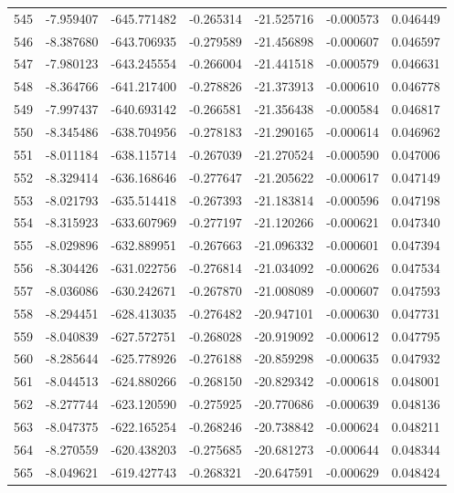 \begin{tabular}{rrrrrrr}
 545 &  -7.959407 & -645.771482 & -0.265314 &  -21.525716 &   -0.000573 &  0.046449 \\
 546 &  -8.387680 & -643.706935 & -0.279589 &  -21.456898 &   -0.000607 &  0.046597 \\
 547 &  -7.980123 & -643.245554 & -0.266004 &  -21.441518 &   -0.000579 &  0.046631 \\
 548 &  -8.364766 & -641.217400 & -0.278826 &  -21.373913 &   -0.000610 &  0.046778 \\
 549 &  -7.997437 & -640.693142 & -0.266581 &  -21.356438 &   -0.000584 &  0.046817 \\
 550 &  -8.345486 & -638.704956 & -0.278183 &  -21.290165 &   -0.000614 &  0.046962 \\
 551 &  -8.011184 & -638.115714 & -0.267039 &  -21.270524 &   -0.000590 &  0.047006 \\
 552 &  -8.329414 & -636.168646 & -0.277647 &  -21.205622 &   -0.000617 &  0.047149 \\
 553 &  -8.021793 & -635.514418 & -0.267393 &  -21.183814 &   -0.000596 &  0.047198 \\
 554 &  -8.315923 & -633.607969 & -0.277197 &  -21.120266 &   -0.000621 &  0.047340 \\
 555 &  -8.029896 & -632.889951 & -0.267663 &  -21.096332 &   -0.000601 &  0.047394 \\
 556 &  -8.304426 & -631.022756 & -0.276814 &  -21.034092 &   -0.000626 &  0.047534 \\
 557 &  -8.036086 & -630.242671 & -0.267870 &  -21.008089 &   -0.000607 &  0.047593 \\
 558 &  -8.294451 & -628.413035 & -0.276482 &  -20.947101 &   -0.000630 &  0.047731 \\
 559 &  -8.040839 & -627.572751 & -0.268028 &  -20.919092 &   -0.000612 &  0.047795 \\
 560 &  -8.285644 & -625.778926 & -0.276188 &  -20.859298 &   -0.000635 &  0.047932 \\
 561 &  -8.044513 & -624.880266 & -0.268150 &  -20.829342 &   -0.000618 &  0.048001 \\
 562 &  -8.277744 & -623.120590 & -0.275925 &  -20.770686 &   -0.000639 &  0.048136 \\
 563 &  -8.047375 & -622.165254 & -0.268246 &  -20.738842 &   -0.000624 &  0.048211 \\
 564 &  -8.270559 & -620.438203 & -0.275685 &  -20.681273 &   -0.000644 &  0.048344 \\
 565 &  -8.049621 & -619.427743 & -0.268321 &  -20.647591 &   -0.000629 &  0.048424 \\

\end{tabular}
